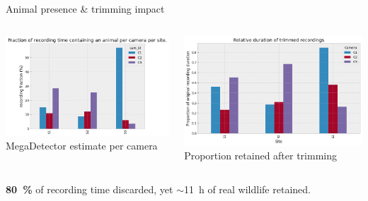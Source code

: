\documentclass[aspectratio=169,xcolor=dvipsnames,t]{beamer}
\begin{document}
\begin{frame}{Animal presence \& trimming impact}
  \begin{columns}[T]
    \begin{column}{0.48\linewidth}
      \includegraphics[width=\linewidth]{figs/raw/frac_animal.png}
      \scriptsize MegaDetector estimate per camera
    \end{column}
    \begin{column}{0.48\linewidth}
      \includegraphics[width=\linewidth]{figs/trimmed/rel_dur_trimmed.png}
      \scriptsize Proportion retained after trimming
    \end{column}
  \end{columns}
  \medskip
  \alert{\textbf{80 \%} of recording time discarded, yet $\sim$11 h of real wildlife retained.}
\end{frame}

\end{document}
